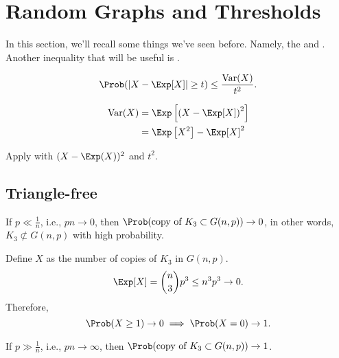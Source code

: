 \newpage
\section{Random Graphs and Thresholds}

In this section, we'll recall some things we've seen before. Namely, the  and . Another inequality that will be useful is .

\begin{lem}\label{lem:chebychevinq}
	\[
		\Prob(|X - \Exp[X]| \ge t ) \le \frac{\Var(X)}{t^2}.
	\]
\end{lem}

\begin{defn}[Variance]\label{defn:variance}
	\begin{align*}
		\Var(X) &= \Exp\left[\left(X - \Exp[X]\right)^2\right] \\
				&= \Exp\left[X^2\right] - \Exp[X]^2
	\end{align*}
\end{defn}

\begin{sk}
	Apply  with $(X-\Exp(X))^2$ and $t^2$.
\end{sk}

\subsection{Triangle-free}

\begin{prop}
	If $p \ll \frac{1}{n}$, i.e., $pn \to 0$, then $\Prob(\text{copy of } K_3 \subset G(n, p)) \to 0$, in other words, $K_3 \not\subset G(n, p)$ with high probability.
\end{prop}

\begin{dem}
	Define $X$ as the number of copies of $K_3$ in $G(n, p)$. \[ \Exp[X] = \binom{n}{3} p^3 \le n^3p^3 \to 0.\]
	Therefore, \[ \Prob(X \ge 1) \to 0 \implies \Prob(X = 0) \to 1. \]	
\end{dem}

\begin{prop}
	If $p \gg \frac{1}{n}$, i.e., $pn \to \infty$, then $\Prob(\text{copy of } K_3 \subset G(n, p)) \to 1$.
\end{prop}


